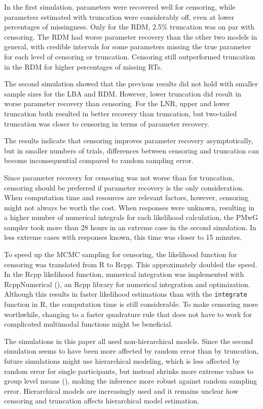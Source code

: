 \documentclass[
  stu,
  floatsintext,
  longtable,
  nolmodern,
  notxfonts,
  notimes,
  draftfirst,
  colorlinks=true,linkcolor=blue,citecolor=blue,urlcolor=blue]{apa7}
\begin{document}
In the first simulation, parameters were recovered well for censoring,
while parameters estimated with truncation were considerably off, even
at lower percentages of missingness. Only for the RDM, 2.5\% truncation
was on par with censoring. The RDM had worse parameter recovery than the
other two models in general, with credible intervals for some parameters
missing the true parameter for each level of censoring or truncation.
Censoring still outperformed truncation in the RDM for higher
percentages of missing RTs.

The second simulation showed that the previous results did not hold with
smaller sample sizes for the LBA and RDM. However, lower truncation did
result in worse parameter recovery than censoring. For the LNR, upper
and lower truncation both resulted in better recovery than truncation,
but two-tailed truncation was closer to censoring in terms of parameter
recovery.

The results indicate that censoring improves parameter recovery
asymptotically, but in smaller numbers of trials, differences between
censoring and truncation can become inconsequential compared to random
sampling error.

Since parameter recovery for censoring was not worse than for
truncation, censoring should be preferred if parameter recovery is the
only consideration. When computation time and resources are relevant
factors, however, censoring might not always be worth the cost. When
responses were unknown, resulting in a higher number of numerical
integrals for each likelihood calculation, the PMwG sampler took more
than 28 hours in an extreme case in the second simulation. In less
extreme cases with responses known, this time was closer to 15 minutes.

To speed up the MCMC sampling for censoring, the likelihood function for
censoring was translated from R to Rcpp. This approximately doubled the
speed. In the Rcpp likelihood function, numerical integration was
implemented with RcppNumerical
(), an Rcpp library
for numerical integration and optimization. Although this results in
faster likelihood estimations than with the \texttt{integrate} function
in R, the computation time is still considerable. To make censoring more
worthwhile, changing to a faster quadrature rule that does not have to
work for complicated multimodal functions might be beneficial.

The simulations in this paper all used non-hierarchical models. Since
the second simulation seems to have been more affected by random error
than by truncation, future simulations might use hierarchical modeling,
which is less affected by random error for single participants, but
instead shrinks more extreme values to group level means
(), making the inference
more robust against random sampling error. Hierarchical models are
increasingly used and it remains unclear how censoring and truncation
affects hierarchical model estimation.
\end{document}
